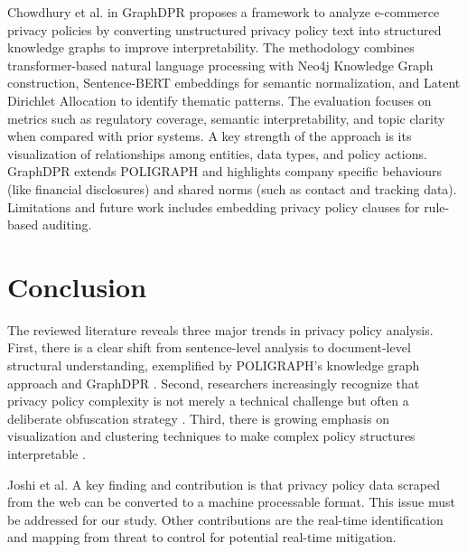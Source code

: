 \documentclass[conference]{IEEEtran}
\begin{document}
Chowdhury et al.\cite{Chowdhury2026} in GraphDPR proposes a framework to analyze e-commerce privacy policies by converting unstructured privacy policy text into structured knowledge graphs to improve interpretability. The methodology combines transformer-based natural language processing with Neo4j Knowledge Graph construction, Sentence-BERT embeddings for semantic normalization, and Latent Dirichlet Allocation to identify thematic patterns. The evaluation focuses on metrics such as regulatory coverage, semantic interpretability, and topic clarity when compared with prior systems. A key strength of the approach is its visualization of relationships among entities, data types, and policy actions. GraphDPR extends POLIGRAPH and highlights company specific behaviours (like financial disclosures) and shared norms (such as contact and tracking data). Limitations and future work includes embedding privacy policy clauses for rule-based auditing. 



\section{Conclusion}

The reviewed literature reveals three major trends in privacy policy analysis. First, there is a clear shift from sentence-level analysis to document-level structural understanding, exemplified by POLIGRAPH's knowledge graph approach and GraphDPR \cite{cui2023} \cite{joshi2020} \cite{Chowdhury2026}. Second, researchers increasingly recognize that privacy policy complexity is not merely a technical challenge but often a deliberate obfuscation strategy \cite{yerby2022}\cite{belcheva2023}. Third, there is growing emphasis on visualization and clustering techniques to make complex policy structures interpretable \cite{ramasamy2025, barrett2025}.  

Joshi et al. \cite{joshi2020} A key finding and contribution is that privacy policy data scraped from the web can be converted to a machine processable format. This issue must be addressed for our study.  Other contributions are the real-time identification and mapping from threat to control for potential real-time mitigation. 
\end{document}
